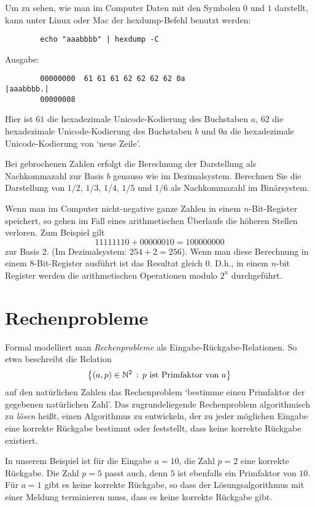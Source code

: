\begin{bem} 
Um zu sehen, wie man im Computer Daten mit den Symbolen $0$ und $1$ darstellt, kann unter Linux oder Mac der hexdump-Befehl benutzt werden:
{\small 
	\begin{verbatim}
		echo "aaabbbb" | hexdump -C
	\end{verbatim}
}
Ausgabe:
{\small 
	\begin{verbatim}
		00000000  61 61 61 62 62 62 62 0a                           |aaabbbb.|
		00000008
	\end{verbatim}
}
Hier ist $61$ die hexadezimale Unicode-Kodierung des Buchstaben $a$, $62$ die hexadezimale Unicode-Kodierung des Buchstaben $b$ und $0a$ die hexadezimale Unicode-Kodierung von `neue Zeile'. 
\end{bem} 


\begin{aufg}
	Bei gebrochenen Zahlen erfolgt die Berechnung der Darstellung als Nachkommazahl zur Basis $b$ genauso wie im Dezimalsystem. Berechnen Sie die Darstellung von $1/2$, $1/3$, $1/4$, $1/5$ und $1/6$ als Nachkommazahl im Binärsystem. 
\end{aufg}

\begin{bem}
	Wenn man im Computer nicht-negative ganze Zahlen in einem $n$-Bit-Register speichert, so gehen im Fall eines arithmetischen Überlaufs die höheren Stellen verloren. Zum Beispiel gilt
	\[
	11111110 + 00000010 = 100000000
	\]
	zur Basis $2$. (Im Dezimalsystem: $254+2 = 256$). Wenn man diese Berechnung in einem $8$-Bit-Register ausführt ist das Resultat gleich $0$. D.h., in einem $n$-bit Register werden die arithmetischen Operationen modulo $2^n$ durchgeführt. 
\end{bem}



\section{Rechenprobleme}
\label{sect:rechenprobleme}

\begin{defn} 
Formal modelliert man \emph{Rechenprobleme} als Eingabe-Rückgabe-Relationen. So etwa beschreibt die Relation
\[
\left\{  (a,p) \in \mathbb{N}^2  \,:\, p \ \text{ist Primfaktor von} \ a \right\}
\]
auf den natürlichen Zahlen das Rechenproblem `bestimme einen Primfaktor der gegebenen natürlichen Zahl'. Das zugrundeliegende Rechenproblem algorithmisch zu \emph{lösen} heißt, einen Algorithmus zu entwickeln, der zu jeder möglichen Eingabe eine korrekte Rückgabe bestimmt oder feststellt, dass keine korrekte Rückgabe existiert. 

In unserem Beispiel ist für die Eingabe $a=10$, die Zahl $p=2$ eine korrekte Rückgabe. Die Zahl $p=5$ passt auch, denn $5$ ist ebenfalls ein Primfaktor von $10$. Für $a=1$ gibt es keine korrekte Rückgabe, so dass der Lösungsalgorithmus mit einer Meldung terminieren muss, dass es keine korrekte Rückgabe gibt. 
\end{defn} 



